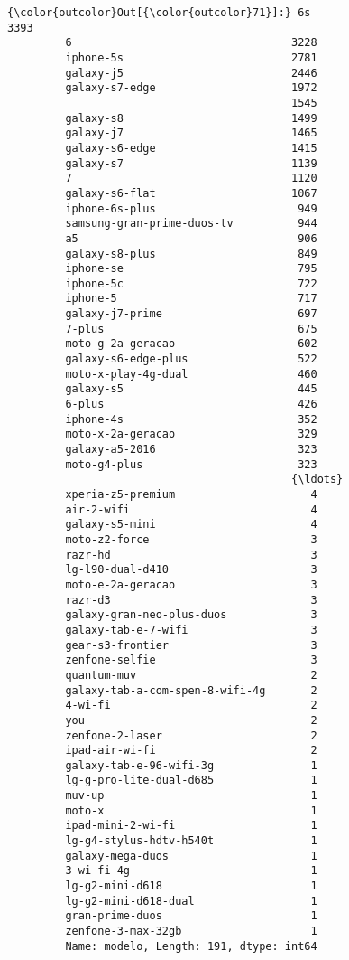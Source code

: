\documentclass[11pt]{article}
\begin{document}
\begin{Verbatim}[commandchars=\\\{\}]
{\color{outcolor}Out[{\color{outcolor}71}]:} 6s                                 3393
         6                                  3228
         iphone-5s                          2781
         galaxy-j5                          2446
         galaxy-s7-edge                     1972
                                            1545
         galaxy-s8                          1499
         galaxy-j7                          1465
         galaxy-s6-edge                     1415
         galaxy-s7                          1139
         7                                  1120
         galaxy-s6-flat                     1067
         iphone-6s-plus                      949
         samsung-gran-prime-duos-tv          944
         a5                                  906
         galaxy-s8-plus                      849
         iphone-se                           795
         iphone-5c                           722
         iphone-5                            717
         galaxy-j7-prime                     697
         7-plus                              675
         moto-g-2a-geracao                   602
         galaxy-s6-edge-plus                 522
         moto-x-play-4g-dual                 460
         galaxy-s5                           445
         6-plus                              426
         iphone-4s                           352
         moto-x-2a-geracao                   329
         galaxy-a5-2016                      323
         moto-g4-plus                        323
                                            {\ldots} 
         xperia-z5-premium                     4
         air-2-wifi                            4
         galaxy-s5-mini                        4
         moto-z2-force                         3
         razr-hd                               3
         lg-l90-dual-d410                      3
         moto-e-2a-geracao                     3
         razr-d3                               3
         galaxy-gran-neo-plus-duos             3
         galaxy-tab-e-7-wifi                   3
         gear-s3-frontier                      3
         zenfone-selfie                        3
         quantum-muv                           2
         galaxy-tab-a-com-spen-8-wifi-4g       2
         4-wi-fi                               2
         you                                   2
         zenfone-2-laser                       2
         ipad-air-wi-fi                        2
         galaxy-tab-e-96-wifi-3g               1
         lg-g-pro-lite-dual-d685               1
         muv-up                                1
         moto-x                                1
         ipad-mini-2-wi-fi                     1
         lg-g4-stylus-hdtv-h540t               1
         galaxy-mega-duos                      1
         3-wi-fi-4g                            1
         lg-g2-mini-d618                       1
         lg-g2-mini-d618-dual                  1
         gran-prime-duos                       1
         zenfone-3-max-32gb                    1
         Name: modelo, Length: 191, dtype: int64
\end{Verbatim}
            
\end{document}
